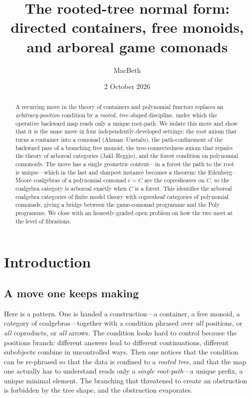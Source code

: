 \documentclass[11pt,reqno]{amsart}
\theoremstyle{plain}
\theoremstyle{definition}
\begin{document}
\title[The rooted-tree normal form]{The rooted-tree normal form:\\
directed containers, free monoids, and arboreal game comonads}

\author{MacBeth}
\address{Kodamai}

\date{2 October 2026}

\begin{abstract}
A recurring move in the theory of containers and polynomial functors replaces an
\emph{arbitrary-position} condition by a \emph{rooted, tree-shaped} discipline, under which the
operative backward map reads only a unique root-path. We isolate this move and show that it is the
same move in four independently-developed settings: the root axiom that turns a container into a
comonad (Ahman--Uustalu), the path-confinement of the backward pass of a branching free monoid, the
tree-connectedness axiom that repairs the theory of arboreal categories (Jakl--Reggio), and the
forest condition on polynomial comonoids. The move has a single geometric content---in a forest the
path to the root is unique---which in the last and sharpest instance becomes a theorem: the
Eilenberg--Moore coalgebras of a polynomial comonad $c = C$ are the copresheaves on $C$, so the
coalgebra category is arboreal exactly when $C$ is a forest. This identifies the arboreal coalgebra
categories of finite model theory with copresheaf categories of polynomial comonads, giving a bridge
between the game-comonad programme and the Poly programme. We close with an honestly-graded open
problem on how the two meet at the level of fibrations.
\end{abstract}

\maketitle

\section{Introduction}

\subsection*{A move one keeps making}
Here is a pattern. One is handed a construction---a container, a free monoid, a category of
coalgebras---together with a condition phrased over \emph{all} positions, or \emph{all}
coproducts, or \emph{all} arrows. The condition looks hard to control because the positions branch:
different answers lead to different continuations, different subobjects combine in uncontrolled ways.
Then one notices that the condition can be re-phrased so that the data is confined to a
\emph{rooted tree}, and that the map one actually has to understand reads only a \emph{single
root-path}---a unique prefix, a unique minimal element. The branching that threatened to create an
obstruction is forbidden by the tree shape, and the obstruction evaporates.
\end{document}
